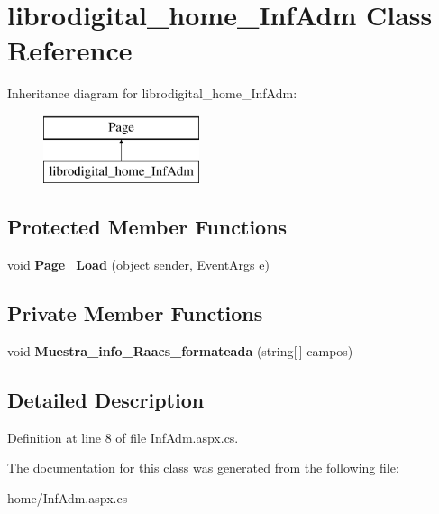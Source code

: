 \hypertarget{classlibrodigital__home___inf_adm}{}\section{librodigital\+\_\+home\+\_\+\+Inf\+Adm Class Reference}
\label{classlibrodigital__home___inf_adm}
Inheritance diagram for librodigital\+\_\+home\+\_\+\+Inf\+Adm\+:\begin{figure}[H]
\begin{center}
\leavevmode
\includegraphics[height=2.000000cm]{classlibrodigital__home___inf_adm}
\end{center}
\end{figure}
\subsection*{Protected Member Functions}
\begin{DoxyCompactItemize}
\item 
void {\bfseries Page\+\_\+\+Load} (object sender, Event\+Args e)\hypertarget{classlibrodigital__home___inf_adm_a3b65a3fb2b3239ee1a7d9889e64b781b}{}\label{classlibrodigital__home___inf_adm_a3b65a3fb2b3239ee1a7d9889e64b781b}

\end{DoxyCompactItemize}
\subsection*{Private Member Functions}
\begin{DoxyCompactItemize}
\item 
void {\bfseries Muestra\+\_\+info\+\_\+\+Raacs\+\_\+formateada} (string\mbox{[}$\,$\mbox{]} campos)\hypertarget{classlibrodigital__home___inf_adm_a586a6c0d99fbc4b61f2df2082ccea1ae}{}\label{classlibrodigital__home___inf_adm_a586a6c0d99fbc4b61f2df2082ccea1ae}

\end{DoxyCompactItemize}


\subsection{Detailed Description}


Definition at line 8 of file Inf\+Adm.\+aspx.\+cs.



The documentation for this class was generated from the following file\+:\begin{DoxyCompactItemize}
\item 
home/Inf\+Adm.\+aspx.\+cs\end{DoxyCompactItemize}
